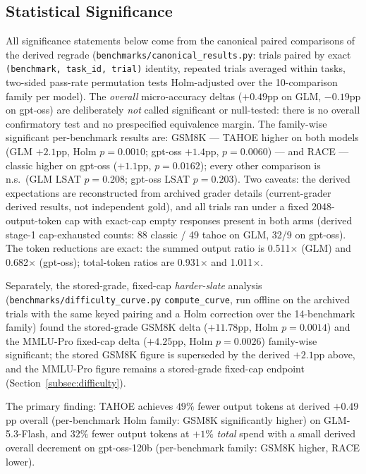 \documentclass[11pt,a4paper]{article}
\begin{document}
\subsection{Statistical Significance}

All significance statements below come from the canonical paired
comparisons of the derived regrade
(\texttt{benchmarks/canonical\_results.py}: trials paired by exact
\texttt{(benchmark, task\_id, trial)} identity, repeated trials averaged
within tasks, two-sided pass-rate permutation tests Holm-adjusted over the
10-comparison family per model). The \emph{overall} micro-accuracy deltas
($+0.49$pp on GLM, $-0.19$pp on gpt-oss) are deliberately \emph{not} called
significant or null-tested: there is no overall confirmatory test and no
prespecified equivalence margin. The family-wise significant per-benchmark
results are: GSM8K --- TAHOE higher on both models (GLM $+2.1$pp, Holm
$p=0.0010$; gpt-oss $+1.4$pp, $p=0.0060$) --- and RACE --- classic higher
on gpt-oss ($+1.1$pp, $p=0.0162$); every other comparison is n.s.\ (GLM
LSAT $p=0.208$; gpt-oss LSAT $p=0.203$). Two caveats: the derived
expectations are reconstructed from archived grader details (current-grader
derived results, not independent gold), and all trials ran under a fixed
2048-output-token cap with exact-cap empty responses present in both arms
(derived stage-1 cap-exhausted counts: 88 classic / 49 tahoe on GLM, 32/9
on gpt-oss). The token reductions are exact: the summed output ratio is
0.511$\times$ (GLM) and 0.682$\times$ (gpt-oss); total-token ratios are
0.931$\times$ and 1.011$\times$.

Separately, the stored-grade, fixed-cap \emph{harder-slate} analysis
(\texttt{benchmarks/difficulty\_curve.py} \texttt{compute\_curve}, run
offline on the archived trials with the same keyed pairing and a Holm
correction over the 14-benchmark family) found the stored-grade GSM8K
delta ($+11.78$pp, Holm $p=0.0014$) and the MMLU-Pro fixed-cap delta
($+4.25$pp, Holm $p=0.0026$) family-wise significant; the stored GSM8K
figure is superseded by the derived $+2.1$pp above, and the MMLU-Pro figure
remains a stored-grade fixed-cap endpoint
(Section~\ref{subsec:difficulty}).

The primary finding: TAHOE achieves $49\%$ fewer output tokens at derived
$+0.49$pp overall (per-benchmark Holm family: GSM8K significantly higher)
on GLM-5.3-Flash, and $32\%$ fewer output tokens
at $+1\%$ \emph{total} spend with a small derived overall decrement on
gpt-oss-120b (per-benchmark family: GSM8K higher, RACE lower).
\end{document}
